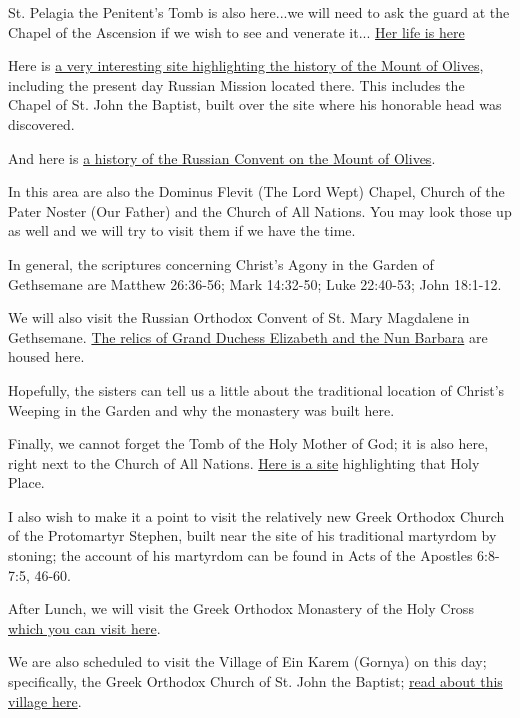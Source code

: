 \documentclass[letterpaper]{report}
\begin{document}
St. Pelagia the Penitent's Tomb is also here...we will need to ask the guard 
at the Chapel of the Ascension if we wish to see and venerate it...
\href{http://www.antiochian.org/node/16762}{
	Her life is here}

Here is 
\href{http://www.pravoslavie.ru/english/46854.htm}{
	a very interesting site highlighting the history of the Mount of Olives},
 including the present day Russian Mission located there.
 This includes the Chapel of St. John the Baptist,
 built over the site where his honorable head was discovered.

And here is \href{http://jerusalem-mission.org/convent_ascension.html}{
	a history of the Russian Convent on the Mount of Olives}.

In this area are also the Dominus Flevit (The Lord Wept) Chapel,
Church of the Pater Noster (Our Father) and the Church of All Nations.
You may look those up as well and we will try to visit them if we have the 
time.

In general, the scriptures concerning Christ's Agony in the Garden of 
Gethsemane are Matthew 26:36-56; Mark 14:32-50; Luke 22:40-53; John 18:1-12.

We will also visit the Russian Orthodox Convent of St. Mary Magdalene in
Gethsemane.
\href{http://www.pravoslavie.ru/english/63239.htm}{
The relics of Grand Duchess Elizabeth and the Nun Barbara} are housed here.

Hopefully, the sisters can tell us a little about the traditional location of 
Christ's Weeping in the Garden and why the monastery was built here.

Finally, we cannot forget the Tomb of the Holy Mother of God;
it is also here, right next to the Church of All Nations.
\href{https://orthodoxword.wordpress.com/2010/08/15/the-tomb-of-the-most-holy-virgin-jerusalem/}{
Here is a site} highlighting that Holy Place.

I also wish to make it a point to visit the relatively new Greek Orthodox
Church of the Protomartyr Stephen,
built near the site of his traditional martyrdom by stoning;
the account of his martyrdom can be found in
Acts of the Apostles 6:8-7:5, 46-60.

After Lunch,
we will visit the Greek Orthodox Monastery of the Holy Cross
\href{http://www.biblewalks.com/Sites/CrossMonastery.html}{
	which you can visit here}.

We are also scheduled to visit the Village of Ein Karem (Gornya)
on this day;
specifically, the Greek Orthodox Church of St. John the Baptist;
\href{https://www.holyland-pilgrimage.org/ein-karem-home-of-john-the-baptist-and-place-of-the-visitation}{read about this village here}.
\end{document}
